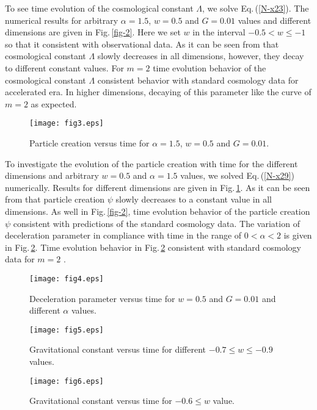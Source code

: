 \documentclass[superscriptaddress,showpacs,pre,twocolumn]{revtex4-1}
\begin{document}
To see time evolution of the cosmological constant $\Lambda$, we solve Eq.\,(\ref{N-x23}). The numerical results for arbitrary $\alpha =1.5$, $w = 0.5$ and $G = 0.01$ values and different dimensions are given in Fig.\,\ref{fig-2}. Here we set $w$ in the interval $-0.5 <w \le -1$ so that it consistent with observational data. As it can be seen from that cosmological constant $\Lambda$ slowly decreases in all dimensions, however, they decay to different constant values. For $m = 2$ time evolution behavior of the cosmological constant $\Lambda$ consistent behavior with standard cosmology data for accelerated era. In higher dimensions, decaying of this parameter like the curve of $m=2$ as expected.   
\begin{figure} [ht!]
	\centering
	\texttt{[image: fig3.eps]}
	\caption{Particle creation versus time for $\alpha =1.5$, $w = 0.5$ and $G = 0.01$.}
	\label{fig-3}
\end{figure}

To investigate the evolution of the particle creation with time for the different dimensions and arbitrary $w = 0.5$ and $\alpha = 1.5$ values, we solved Eq.\,(\ref{N-x29}) numerically. Results for different dimensions are given in Fig.\,\ref{fig-3}.
As it can be seen from that particle creation $\psi$ slowly decreases to a constant value in all dimensions. As well in Fig.\,\ref{fig-2}, time evolution behavior of the particle creation $\psi$ consistent with predictions of the standard cosmology data. The variation of deceleration parameter in compliance with time in the range of $0 < \alpha <2$ is given in Fig.\,\ref{fig-4}. Time evolution behavior in Fig.\,\ref{fig-4} consistent with standard cosmology data for $m = 2$  \cite{Pradhan2006,Pradhan2007}.
\begin{figure} [ht!]
	\centering
	\texttt{[image: fig4.eps]}
	\caption{Deceleration parameter versus time for $w = 0.5$ and $G = 0.01$ and different $\alpha$ values.}
	\label{fig-4}
\end{figure}
\begin{figure} [ht!]
	\centering
	\texttt{[image: fig5.eps]}
	\caption{Gravitational constant versus time for different $-0.7 \le w \le -0.9$ values.}
	\label{fig-5}
\end{figure}
\begin{figure} [ht!]
	\centering
	\texttt{[image: fig6.eps]}
	\caption{Gravitational constant versus time for $-0.6 \le w$ value.}
	\label{fig-6}
\end{figure}
\end{document}
